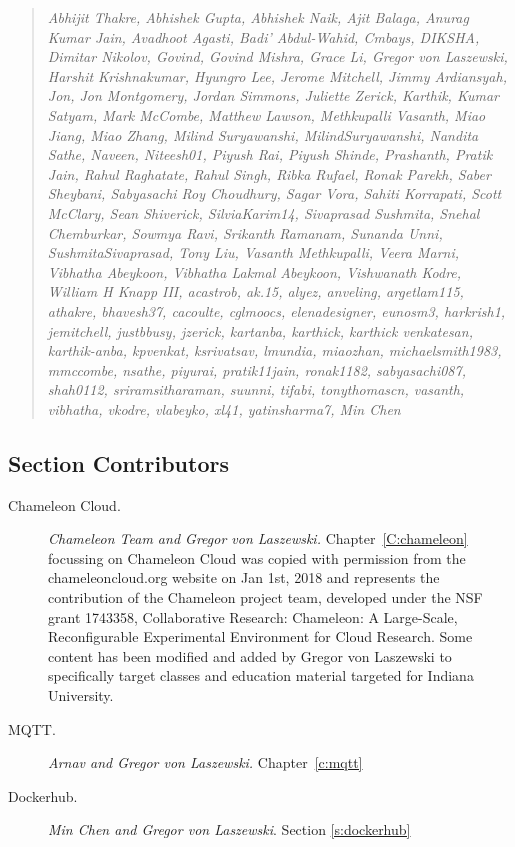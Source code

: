 \begin{quotation}{\em
Abhijit Thakre, Abhishek Gupta, Abhishek Naik, Ajit Balaga, Anurag
Kumar Jain, Avadhoot Agasti, Badi' Abdul-Wahid, Cmbays, DIKSHA,
Dimitar Nikolov, Govind, Govind Mishra, Grace Li, Gregor von
Laszewski, Harshit Krishnakumar, Hyungro Lee, Jerome Mitchell, Jimmy
Ardiansyah, Jon, Jon Montgomery, Jordan Simmons, Juliette Zerick,
Karthik, Kumar Satyam, Mark McCombe, Matthew Lawson, Methkupalli
Vasanth, Miao Jiang, Miao Zhang, Milind Suryawanshi,
MilindSuryawanshi, Nandita Sathe, Naveen, Niteesh01, Piyush Rai,
Piyush Shinde, Prashanth, Pratik Jain, Rahul Raghatate, Rahul Singh,
Ribka Rufael, Ronak Parekh, Saber Sheybani, Sabyasachi Roy Choudhury,
Sagar Vora, Sahiti Korrapati, Scott McClary, Sean Shiverick,
SilviaKarim14, Sivaprasad Sushmita, Snehal Chemburkar, Sowmya Ravi,
Srikanth Ramanam, Sunanda Unni, SushmitaSivaprasad, Tony Liu, Vasanth
Methkupalli, Veera Marni, Vibhatha Abeykoon, Vibhatha Lakmal Abeykoon,
Vishwanath Kodre, William H Knapp III, acastrob, ak.15, alyez,
anveling, argetlam115, athakre, bhavesh37, cacoulte, cglmoocs,
elenadesigner, eunosm3, harkrish1, jemitchell, justbbusy, jzerick,
kartanba, karthick, karthick venkatesan, karthik-anba, kpvenkat,
ksrivatsav, lmundia, miaozhan, michaelsmith1983, mmccombe, nsathe,
piyurai, pratik11jain, ronak1182, sabyasachi087,
shah0112, sriramsitharaman, suunni, tifabi, tonythomascn, vasanth,
vibhatha, vkodre, vlabeyko, xl41, yatinsharma7, Min Chen
}\end{quotation}

\subsection{Section Contributors}

\begin{description}

\item[Chameleon Cloud.] \textit{Chameleon Team and
    Gregor von Laszewski.}  Chapter~\ref{C:chameleon} focussing on
  Chameleon Cloud was copied with permission from the
  chameleoncloud.org website on Jan 1st, 2018 and represents the
  contribution of the Chameleon project team, developed under the NSF
  grant 1743358, Collaborative Research: Chameleon: A Large-Scale,
  Reconfigurable Experimental Environment for Cloud Research. Some
  content has been modified and added by Gregor von Laszewski to
  specifically target classes and education material targeted for
  Indiana University.

\item[MQTT.] \textit{Arnav and Gregor von Laszewski.} Chapter~\ref{c:mqtt} 

\item[Dockerhub.] \emph{Min Chen and Gregor von Laszewski}. Section \ref{s:dockerhub}

\end{description}


